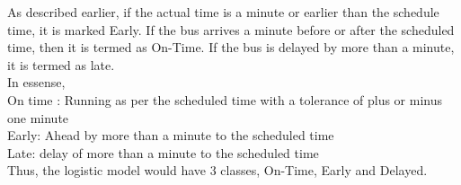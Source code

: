 \documentclass[12pt]{article}\usepackage[]{graphicx}\usepackage[]{color}
\begin{document}
As described earlier, if the actual time is a minute or earlier than the schedule time, it is marked Early. If the bus arrives a minute before or after the scheduled time, then it is termed as On-Time. If the bus is delayed by more than a minute, it is termed as late.\\

In essense,\\
On time : Running as per the scheduled time with a tolerance of plus or minus one minute\\
Early: Ahead by more than a minute to the scheduled time\\
Late: delay of more than a minute to the scheduled time\\

Thus, the logistic model would have 3 classes, On-Time, Early and Delayed.\\
\end{document}
